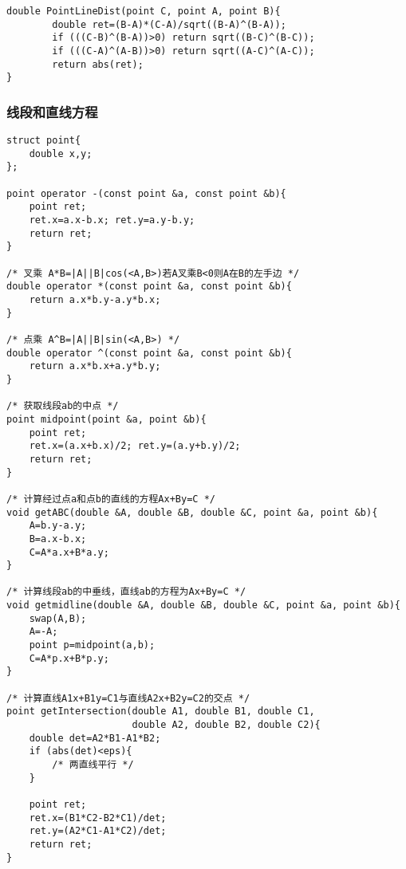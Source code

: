 \begin{verbatim}
double PointLineDist(point C, point A, point B){
        double ret=(B-A)*(C-A)/sqrt((B-A)^(B-A));
        if (((C-B)^(B-A))>0) return sqrt((B-C)^(B-C));
        if (((C-A)^(A-B))>0) return sqrt((A-C)^(A-C));
        return abs(ret);
}
\end{verbatim}

\subsubsection{线段和直线方程}
\begin{verbatim}
struct point{
    double x,y;
};

point operator -(const point &a, const point &b){
    point ret;
    ret.x=a.x-b.x; ret.y=a.y-b.y;
    return ret;
}

/* 叉乘 A*B=|A||B|cos(<A,B>)若A叉乘B<0则A在B的左手边 */
double operator *(const point &a, const point &b){
    return a.x*b.y-a.y*b.x;
}

/* 点乘 A^B=|A||B|sin(<A,B>) */
double operator ^(const point &a, const point &b){
    return a.x*b.x+a.y*b.y;
}

/* 获取线段ab的中点 */
point midpoint(point &a, point &b){
    point ret;
    ret.x=(a.x+b.x)/2; ret.y=(a.y+b.y)/2;
    return ret;
}

/* 计算经过点a和点b的直线的方程Ax+By=C */
void getABC(double &A, double &B, double &C, point &a, point &b){
    A=b.y-a.y;
    B=a.x-b.x;
    C=A*a.x+B*a.y;
}

/* 计算线段ab的中垂线，直线ab的方程为Ax+By=C */
void getmidline(double &A, double &B, double &C, point &a, point &b){
    swap(A,B);
    A=-A;
    point p=midpoint(a,b);
    C=A*p.x+B*p.y;
}

/* 计算直线A1x+B1y=C1与直线A2x+B2y=C2的交点 */
point getIntersection(double A1, double B1, double C1,
                      double A2, double B2, double C2){
    double det=A2*B1-A1*B2;
    if (abs(det)<eps){
        /* 两直线平行 */
    }

    point ret;
    ret.x=(B1*C2-B2*C1)/det;
    ret.y=(A2*C1-A1*C2)/det;
    return ret;
}
\end{verbatim}


